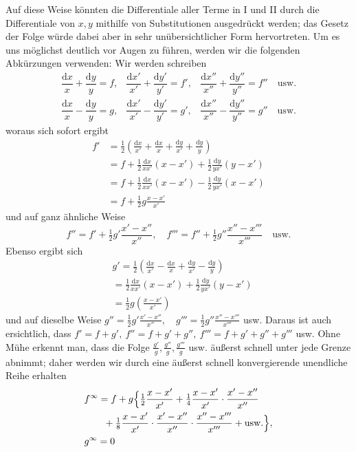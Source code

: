Auf diese Weise könnten die Differentiale aller Terme in I und II durch die Differentiale von
$x,y$ mithilfe von Substitutionen ausgedrückt werden; das Gesetz der Folge würde dabei aber in sehr
unübersichtlicher Form hervortreten. Um es uns möglichst deutlich vor Augen zu führen, werden wir die folgenden
Abkürzungen verwenden: Wir werden schreiben
\[
\begin{array}{lll}
\dfrac{\mathrm{d}x}{x}+\dfrac{\mathrm{d}y}{y}=f,&
\dfrac{\mathrm{d}x'}{x'}+\dfrac{\mathrm{d}y'}{y'}=f',&
\dfrac{\mathrm{d}x''}{x''}+\dfrac{\mathrm{d}y''}{y''}=f''\quad\mathrm{usw.}\\[7pt]
\dfrac{\mathrm{d}x}{x}-\dfrac{\mathrm{d}y}{y}=g,&
\dfrac{\mathrm{d}x'}{x'}-\dfrac{\mathrm{d}y'}{y'}=g',&
\dfrac{\mathrm{d}x''}{x''}-\dfrac{\mathrm{d}y''}{y''}=g''\quad\mathrm{usw.}
\end{array}
\]
woraus sich sofort ergibt
\[
\begin{aligned}
f'&=\tfrac12\left(\frac{\mathrm{d}x}{x'}+\frac{\mathrm{d}x}{x}+\frac{\mathrm{d}y}{x'}+\frac{\mathrm{d}y}{y}\right)\\&=f+\tfrac12\frac{\mathrm{d}x}{xx'}(x-x')+\tfrac12\frac{\mathrm{d}y}{yx'}(y-x')\\[7pt]
&=f+\tfrac12\frac{\mathrm{d}x}{xx'}(x-x')-\tfrac12\frac{\mathrm{d}y}{yx'}(x-x')\\&=f+\tfrac12 g\frac{x-x'}{x'}
\end{aligned}
\]
und auf ganz ähnliche Weise
\[
f''=f'+\tfrac12 g'\frac{x'-x''}{x''},\quad
f'''=f''+\tfrac12 g''\frac{x''-x'''}{x'''}\quad\mathrm{usw.}
\]
Ebenso ergibt sich
\[
\begin{aligned}&g'=\tfrac12\left(\frac{\mathrm{d}x}{x'}-\frac{\mathrm{d}x}{x}+\frac{\mathrm{d}y}{x'}-\frac{\mathrm{d}y}{y}\right)\\&=\tfrac12\frac{\mathrm{d}x}{xx'}(x-x')+\tfrac12\frac{\mathrm{d}y}{yx'}(y-x')\\&=\tfrac12 g\left(\frac{x-x'}{x'}\right)\end{aligned}
\]
und auf dieselbe Weise \(g''=\tfrac12 g'\frac{x'-x''}{x''},\quad
g'''=\tfrac12 g''\frac{x''-x'''}{x'''}\) usw.
Daraus ist auch ersichtlich, dass
\(f'=f+g',\ f''=f+g'+g'',\ f'''=f+g'+g''+g'''\) usw.
Ohne Mühe erkennt man, dass die Folge
\(\frac{g'}{g},\frac{g''}{g},\frac{g'''}{g}\) usw.
äußerst schnell unter jede Grenze abnimmt; daher werden wir durch eine äußerst schnell konvergierende unendliche Reihe erhalten
\[
\begin{aligned}&f^\infty=f+g\Bigl\{\tfrac12\frac{x-x'}{x'}
+\tfrac14\frac{x-x'}{x'}\cdot\frac{x'-x''}{x''}\\&\qquad+\tfrac18\frac{x-x'}{x'}\cdot\frac{x'-x''}{x''}\cdot\frac{x''-x'''}{x'''}
+\mathrm{usw.}\Bigr\},\\&g^\infty=0\end{aligned}
\]

